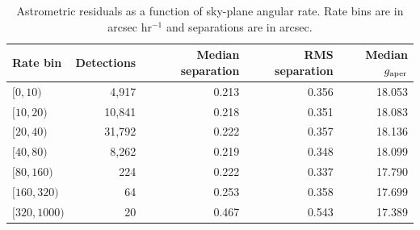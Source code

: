\begin{table}
\centering
\caption{Astrometric residuals as a function of sky-plane angular rate. Rate bins are in arcsec hr$^{-1}$ and separations are in arcsec.}
\label{tab:rate_astrometry}
\footnotesize
\setlength{\tabcolsep}{6pt}
\renewcommand{\arraystretch}{1.12}
\begin{tabular}{lrrrr}
\toprule
Rate bin & Detections & Median separation & RMS separation & Median $g_{\rm aper}$ \\
\midrule
$[0,10)$ & 4,917 & 0.213 & 0.356 & 18.053 \\
$[10,20)$ & 10,841 & 0.218 & 0.351 & 18.083 \\
$[20,40)$ & 31,792 & 0.222 & 0.357 & 18.136 \\
$[40,80)$ & 8,262 & 0.219 & 0.348 & 18.099 \\
$[80,160)$ & 224 & 0.222 & 0.337 & 17.790 \\
$[160,320)$ & 64 & 0.253 & 0.358 & 17.699 \\
$[320,1000)$ & 20 & 0.467 & 0.543 & 17.389 \\
\bottomrule
\end{tabular}
\end{table}
